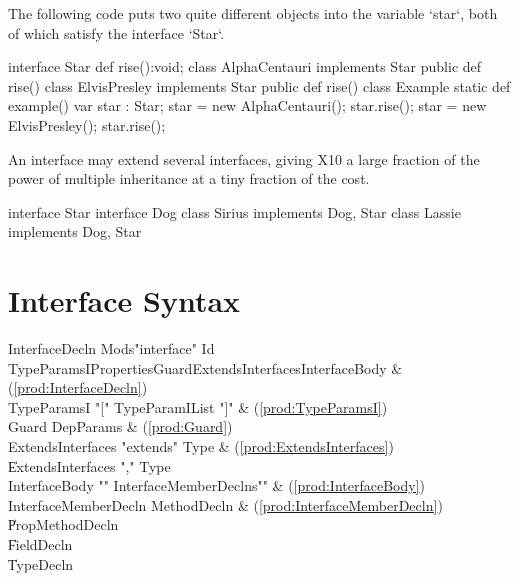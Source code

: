 \begin{ex}
The following code puts two quite different objects into the variable
\xcd`star`, both of which satisfy the interface \xcd`Star`.
\begin{xten}
interface Star { def rise():void; }
class AlphaCentauri implements Star {
   public def rise() {}
}
class ElvisPresley implements Star {
   public def rise() {}
}
class Example {
   static def example() {
      var star : Star;
      star = new AlphaCentauri();
      star.rise();
      star = new ElvisPresley();
      star.rise();
   }
}
\end{xten}
%
\end{ex}
An interface may extend several interfaces, giving
X10 a large fraction of the power of multiple inheritance at a tiny fraction
of the cost.

\begin{ex}
\begin{xten}
interface Star{}
interface Dog{}
class Sirius implements Dog, Star{}
class Lassie implements Dog, Star{}
\end{xten}
%
\end{ex}


\section{Interface Syntax}

\label{DepType:Interface}

\begin{bbgrammar}
      InterfaceDecln \: Mods\opt \xcd"interface" Id TypeParamsI\opt Properties\opt Guard\opt ExtendsInterfaces\opt InterfaceBody & (\ref{prod:InterfaceDecln}) \\
         TypeParamsI \: \xcd"[" TypeParamIList \xcd"]" & (\ref{prod:TypeParamsI}) \\
               Guard \: DepParams & (\ref{prod:Guard}) \\
   ExtendsInterfaces \: \xcd"extends" Type & (\ref{prod:ExtendsInterfaces}) \\
                     \| ExtendsInterfaces \xcd"," Type \\
       InterfaceBody \: \xcd"{" InterfaceMemberDeclns\opt \xcd"}" & (\ref{prod:InterfaceBody}) \\
InterfaceMemberDecln \: MethodDecln & (\ref{prod:InterfaceMemberDecln}) \\
                     \| PropMethodDecln \\
                     \| FieldDecln \\
                     \| TypeDecln \\
\end{bbgrammar}


